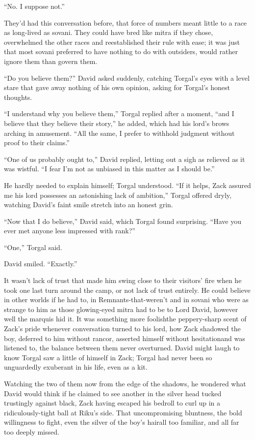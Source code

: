 ``No. I suppose not.''

They'd had this conversation before, that force of numbers meant little to a race as long-lived as sovani. They could have bred like mitra if they chose, overwhelmed the other races and reestablished their rule with ease; it was just that most sovani preferred to have nothing to do with outsiders, would rather ignore them than govern them.

``Do you believe them?'' David asked suddenly, catching Torgal's eyes with a level stare that gave away nothing of his own opinion, asking for Torgal's honest thoughts.

``I understand why you believe them,'' Torgal replied after a moment, ``and I believe that they believe their story,'' he added, which had his lord's brows arching in amusement. ``All the same, I prefer to withhold judgment without proof to their claims.''

``One of us probably ought to,'' David replied, letting out a sigh as relieved as it was wistful. ``I fear I'm not as unbiased in this matter as I should be.''

He hardly needed to explain himself; Torgal understood. ``If it helps, Zack assured me his lord possesses an astonishing lack of ambition,'' Torgal offered dryly, watching David's faint smile stretch into an honest grin.

``Now that I do believe,'' David said, which Torgal found surprising. ``Have you ever met anyone less impressed with rank?''

``One,'' Torgal said.

David smiled. ``Exactly.''

It wasn't lack of trust that made him swing close to their visitors' fire when he took one last turn around the camp, or not lack of trust entirely. He could believe in other worlds if he had to, in Remnants-that-weren't and in sovani who were as strange to him as those glowing-eyed mitra had to be to Lord David, however well the marquis hid it. It was something more foolish\textemdash the peppery-sharp scent of Zack's pride whenever conversation turned to his lord, how Zack shadowed the boy, deferred to him without rancor, asserted himself without hesitation\textemdash and was listened to, the balance between them never overturned. David might laugh to know Torgal saw a little of himself in Zack; Torgal had never been so unguardedly exuberant in his life, even as a kit.

Watching the two of them now from the edge of the shadows, he wondered what David would think if he claimed to see another in the silver head tucked trustingly against black, Zack having escaped his bedroll to curl up in a ridiculously-tight ball at Riku's side. That uncompromising bluntness, the bold willingness to fight, even the silver of the boy's hair\textemdash all too familiar, and all far too deeply missed.

